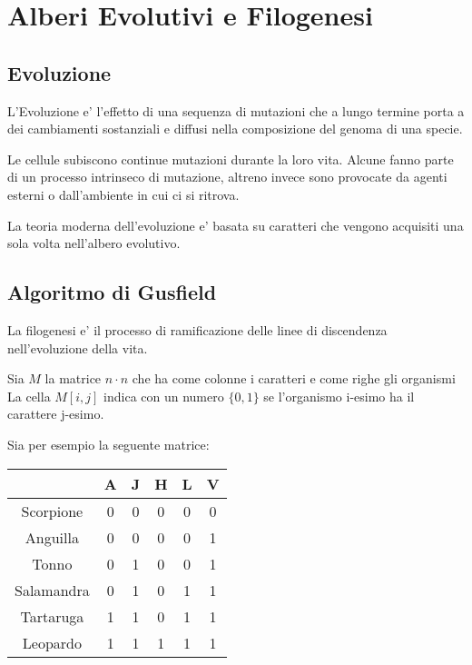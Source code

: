 \chapter{Alberi Evolutivi e Filogenesi}

\section{Evoluzione}

L'Evoluzione e' l'effetto di una sequenza di mutazioni che a lungo termine porta a dei cambiamenti sostanziali e diffusi nella composizione del genoma di una specie.

Le cellule subiscono continue mutazioni durante la loro vita. Alcune fanno parte di un processo intrinseco di mutazione, altreno invece sono provocate da agenti esterni o dall'ambiente in cui ci si ritrova.

La teoria moderna dell'evoluzione e' basata su caratteri che vengono acquisiti una sola volta nell'albero evolutivo.

\section{Algoritmo di Gusfield}

La filogenesi e' il processo di ramificazione delle linee di discendenza nell'evoluzione della vita.

Sia $M$ la matrice $n \cdot n$ che ha come colonne i caratteri e come righe gli organismi La cella $M[i,j]$ indica con un numero $\{0,1\}$ se l'organismo i-esimo ha il carattere j-esimo.

Sia per esempio la seguente matrice:

\begin{center}
    \begin{tabular}{||c c c c c c||}
        \hline
        & A & J & H & L & V \\
        \hline
        Scorpione & 0 & 0 & 0 & 0 & 0 \\
        Anguilla & 0 & 0 & 0 & 0 & 1 \\
        Tonno & 0 & 1 & 0 & 0 & 1 \\
        Salamandra & 0 & 1 & 0 & 1 & 1 \\
        Tartaruga & 1 & 1 & 0 & 1 & 1 \\
        Leopardo & 1 & 1 & 1 & 1 & 1 \\
        \hline
    \end{tabular}
\end{center}

